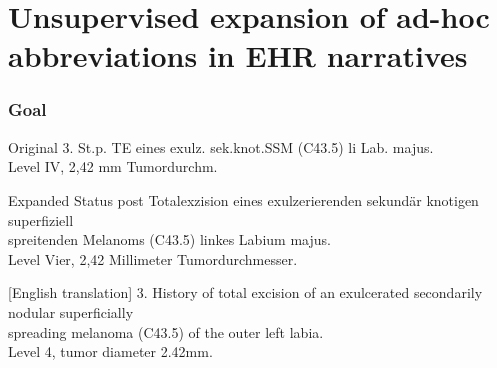 \section{Unsupervised expansion of ad-hoc abbreviations in EHR narratives}


\begin{frame}
	\frametitle{Goal}
	\begin{exampleblock}{Original}
	3. St.p. TE eines exulz. sek.knot.SSM (C43.5) li Lab. majus.\\
	Level IV, 2,42 mm Tumordurchm.
	\end{exampleblock}
	
	\pause
	
	\begin{exampleblock}{Expanded}
	Status post Totalexzision eines exulzerierenden sekundär knotigen superfiziell\\
	spreitenden Melanoms (C43.5) linkes Labium majus.\\
	Level Vier, 2,42 Millimeter Tumordurchmesser.
	\end{exampleblock}
	
	\begin{exampleblock}{[English translation]}
	3. History of total excision of an exulcerated secondarily nodular superficially\\
	spreading melanoma (C43.5) of the outer left labia.\\
	Level 4, tumor diameter 2.42mm.
	\end{exampleblock}
\end{frame}
